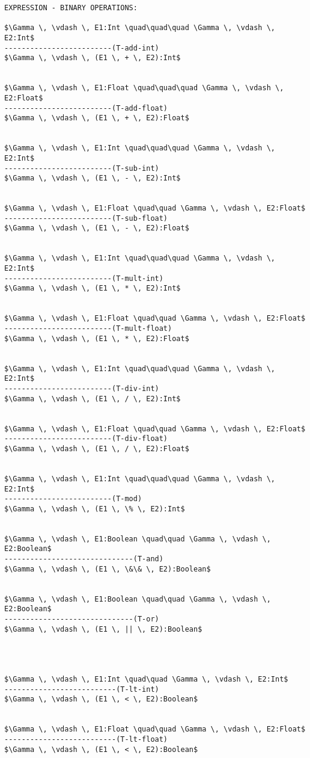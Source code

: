 \documentclass[11pt, a4paper]{article}
\begin{document}
\begin{lstlisting}
EXPRESSION - BINARY OPERATIONS:

$\Gamma \, \vdash \, E1:Int \quad\quad\quad \Gamma \, \vdash \, E2:Int$
-------------------------(T-add-int)
$\Gamma \, \vdash \, (E1 \, + \, E2):Int$


$\Gamma \, \vdash \, E1:Float \quad\quad\quad \Gamma \, \vdash \, E2:Float$
-------------------------(T-add-float)
$\Gamma \, \vdash \, (E1 \, + \, E2):Float$


$\Gamma \, \vdash \, E1:Int \quad\quad\quad \Gamma \, \vdash \, E2:Int$
-------------------------(T-sub-int)
$\Gamma \, \vdash \, (E1 \, - \, E2):Int$


$\Gamma \, \vdash \, E1:Float \quad\quad \Gamma \, \vdash \, E2:Float$
-------------------------(T-sub-float)
$\Gamma \, \vdash \, (E1 \, - \, E2):Float$


$\Gamma \, \vdash \, E1:Int \quad\quad\quad \Gamma \, \vdash \, E2:Int$
-------------------------(T-mult-int)
$\Gamma \, \vdash \, (E1 \, * \, E2):Int$


$\Gamma \, \vdash \, E1:Float \quad\quad \Gamma \, \vdash \, E2:Float$
-------------------------(T-mult-float)
$\Gamma \, \vdash \, (E1 \, * \, E2):Float$


$\Gamma \, \vdash \, E1:Int \quad\quad\quad \Gamma \, \vdash \, E2:Int$
-------------------------(T-div-int)
$\Gamma \, \vdash \, (E1 \, / \, E2):Int$


$\Gamma \, \vdash \, E1:Float \quad\quad \Gamma \, \vdash \, E2:Float$
-------------------------(T-div-float)
$\Gamma \, \vdash \, (E1 \, / \, E2):Float$


$\Gamma \, \vdash \, E1:Int \quad\quad\quad \Gamma \, \vdash \, E2:Int$
-------------------------(T-mod)
$\Gamma \, \vdash \, (E1 \, \% \, E2):Int$


$\Gamma \, \vdash \, E1:Boolean \quad\quad \Gamma \, \vdash \, E2:Boolean$
------------------------------(T-and)
$\Gamma \, \vdash \, (E1 \, \&\& \, E2):Boolean$


$\Gamma \, \vdash \, E1:Boolean \quad\quad \Gamma \, \vdash \, E2:Boolean$
------------------------------(T-or)
$\Gamma \, \vdash \, (E1 \, || \, E2):Boolean$




$\Gamma \, \vdash \, E1:Int \quad\quad \Gamma \, \vdash \, E2:Int$
--------------------------(T-lt-int)
$\Gamma \, \vdash \, (E1 \, < \, E2):Boolean$


$\Gamma \, \vdash \, E1:Float \quad\quad \Gamma \, \vdash \, E2:Float$
--------------------------(T-lt-float)
$\Gamma \, \vdash \, (E1 \, < \, E2):Boolean$



\end{lstlisting}
\end{document}
